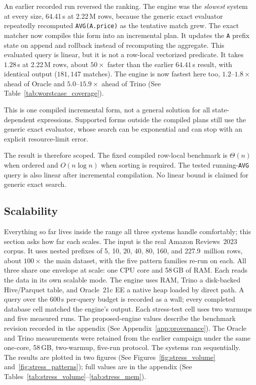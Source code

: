 An earlier recorded run reversed the ranking.  The engine was the
\emph{slowest} system at every size, 64.41\,s at 2.22\,M rows, because
the generic exact evaluator repeatedly recomputed
\texttt{AVG(A.price)} as the tentative match grew.  The exact matcher
now compiles this form into an incremental plan.  It updates the
\texttt{A} prefix state on append and rollback instead of recomputing
the aggregate.  This evaluated query is linear, but it is not a
row-local vectorized predicate.  It takes $1.28$\,s at 2.22\,M rows,
about $50\times$ faster than the earlier $64.41$\,s result, with identical output
($181{,}147$ matches).  The engine is now fastest here
too, $1.2$--$1.8\times$ ahead of Oracle and $5.0$--$15.9\times$ ahead
of Trino (See Table~\ref{tab:worstcase_coverage}).

This is one compiled incremental form, not a general solution for all
state-dependent expressions.  Supported forms outside the compiled
plans still use the generic exact evaluator, whose search can be
exponential and can stop with an explicit resource-limit error.

The result is therefore scoped.  The fixed compiled row-local benchmark
is $\Theta(n)$ when ordered and $O(n\log n)$ when sorting is required.
The tested running-\texttt{AVG} query is also linear after incremental
compilation.  No linear bound is claimed for generic exact search.

\subsection{Scalability}
\label{subsec:eval-stress}

Everything so far lives inside the range all three systems handle
comfortably; this section asks how far each scales.  The input is the
real Amazon Reviews~2023 corpus.  It uses nested prefixes of 5, 10, 20,
40, 80, 160, and 227.9~million rows, about $100\times$ the main
dataset, with the five pattern families re-run on each.  All three
share one envelope at scale: one CPU core and 58\,GB of RAM.  Each reads the data
in its own scalable mode.  The engine uses RAM, Trino a disk-backed
Hive/Parquet table, and Oracle~21c EE a native heap
loaded by direct path.  A query over the 600\,s per-query
budget is recorded as a wall; every completed database cell matched the
engine's output.  Each stress-test cell uses two warmups and five
measured runs.  The proposed-engine values describe the benchmark revision
recorded in the appendix (See Appendix~\ref{app:provenance}).  The Oracle
and Trino measurements were
retained from the earlier campaign under the same one-core, 58\,GB,
two-warmup, five-run protocol.  The systems ran sequentially.
The results are plotted in two figures (See
Figures~\ref{fig:stress_volume} and~\ref{fig:stress_patterns}); full
values are in the appendix (See
Tables~\ref{tab:stress_volume}--\ref{tab:stress_mem}).

